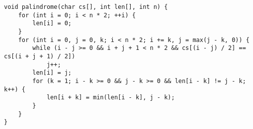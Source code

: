 \begin{lstlisting}
void palindrome(char cs[], int len[], int n) { 
	for (int i = 0; i < n * 2; ++i) {
		len[i] = 0;
	}
	for (int i = 0, j = 0, k; i < n * 2; i += k, j = max(j - k, 0)) {
		while (i - j >= 0 && i + j + 1 < n * 2 && cs[(i - j) / 2] == cs[(i + j + 1) / 2])
			j++;
		len[i] = j;
		for (k = 1; i - k >= 0 && j - k >= 0 && len[i - k] != j - k; k++) {
			len[i + k] = min(len[i - k], j - k);
		}
	}
}
\end{lstlisting}
